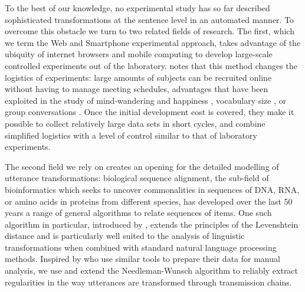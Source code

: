 To the best of our knowledge, no experimental study has so far described sophisticated transformations at the sentence level in an automated manner. 
To overcome this obstacle we turn to two related fields of research. The
first, which we term the Web and Smartphone experimental approach, %
takes advantage of the ubiquity of internet browsers and mobile computing to develop
large-scale controlled experiments out of the laboratory.
\textcite{miller_smartphone_2012} %
notes that this method changes the logistics %
of experiments: large amounts of subjects can be recruited online without
having to manage meeting schedules, %
advantages
that have been exploited in the study of mind-wandering and happiness
\autocites{killingsworth_wandering_2010}{mackerron_happiness_2013}{bastian_language_2017},
 vocabulary size
\autocites{keuleers_word_2015}{brysbaert_how_2016}, %
or group conversations \autocite[][which also involves many subjects simultaneously]{niculae_conversational_2016}.
Once the initial development cost is covered, they make it
possible to collect relatively large data sets in short cycles, and
combine simplified logistics with a level of control similar to that of
laboratory experiments.

The second field we rely on creates an opening for the detailed
modelling of utterance transformations: biological sequence alignment,
the sub-field of bioinformatics which seeks to uncover commonalities in
sequences of DNA, RNA, or amino acids in proteins from different
species, has developed over the last 50 years a range of general
algorithms to relate sequences of items. One such algorithm in
particular, introduced by \textcite{needleman_general_1970}, extends the
principles of the Levenshtein distance and is particularly well suited
to the analysis of linguistic transformations when combined with
standard natural language processing methods. Inspired by
\textcite{lauf_analyzing_2013} who use similar tools to prepare their
data for manual analysis, we use and extend the Needleman-Wunsch
algorithm to reliably extract regularities in the way utterances are
transformed through transmission chains.
